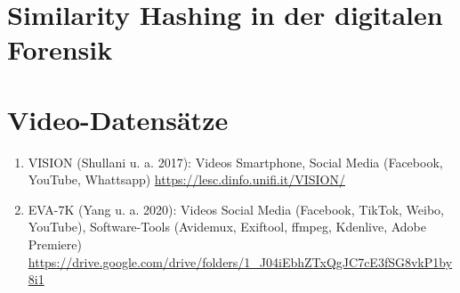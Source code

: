 
\section{Similarity Hashing in der digitalen Forensik}




\section{Video-Datensätze}

\begin{enumerate}
    \item VISION (Shullani u. a. 2017)\cite{shullani_vision_2017}: Videos Smartphone, Social Media (Facebook, YouTube, Whattsapp) \url{https://lesc.dinfo.unifi.it/VISION/}
    \item EVA-7K (Yang u. a. 2020)\cite{yang_efficient_2020}: Videos Social Media (Facebook, TikTok, Weibo, YouTube), Software-Tools (Avidemux, Exiftool, ffmpeg, Kdenlive, Adobe Premiere) \url{https://drive.google.com/drive/folders/1_J04iEbhZTxQgJC7cE3fSG8vkP1by8i1}
\end{enumerate}